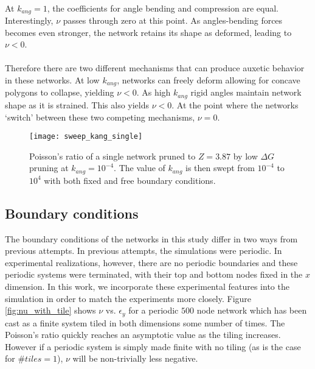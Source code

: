 \documentclass[9pt,twocolumn,twoside]{pnas-new}
\begin{document}
\paragraph{}
At $k_{ang}=1$, the coefficients for angle bending and compression are equal.  Interestingly, $\nu$ passes through zero at this point.  As angles-bending forces becomes even stronger, the network retains its shape as deformed, leading to $\nu<0$. 
\paragraph{}
Therefore there are two different mechanisms that can produce auxetic behavior in these networks.  At low $k_{ang}$, networks can freely deform allowing for concave polygons to collapse, yielding $\nu<0$.  As high $k_{ang}$ rigid angles maintain network shape as it is strained.  This also yields $\nu<0$.  At the point where the networks `switch' between these two competing mechanisms, $\nu=0$.
 
 
 \begin{figure}
	\centering
	\texttt{[image: sweep\_kang\_single]}
	\caption{Poisson's ratio of a single network pruned to $Z=3.87$ by low $\Delta G$ pruning at $k_{ang}=10^{-4}$.  The value of $k_{ang}$ is then swept from $10^{-4}$ to $10^{4}$ with both fixed and free boundary conditions.  }
	\label{fig:sweep_kang_single}
\end{figure}
 
 
 \subsection*{Boundary conditions}
The boundary conditions of the networks in this study differ in two ways from previous attempts.  In previous attempts, the simulations were periodic.  In experimental realizations, however, there are no periodic boundaries and these periodic systems were terminated, with their top and bottom nodes fixed in the $x$ dimension.  In this work, we incorporate these experimental features into the simulation in order to match the experiments more closely.  Figure \ref{fig:nu_with_tile} shows $\nu$ vs. $\epsilon_{y}$ for a periodic $500$ node network which has been cast as a finite system tiled in both dimensions some number of times.  The Poisson's ratio quickly reaches an asymptotic value as the tiling increases.  However if a periodic system is simply made finite with no tiling (as is the case for $\#tiles = 1$), $\nu$ will be non-trivially less negative.  
\end{document}
